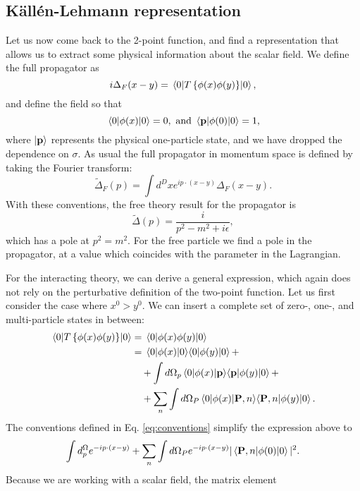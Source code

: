 \documentclass{article}
\numberwithin{equation}{section}
\begin{document}
\subsection{Källén-Lehmann representation}
Let us now come back to the 2-point function, and find a representation that allows us to extract some physical information about the scalar field. We define the full propagator as 
\begin{equation}
    i\Delta_F(x-y) = \ev{T\left\{\phi(x) \phi(y)\right\}}{0},
\end{equation}
and define the field so that 
\begin{equation} \label{eq:conventions}
    \ev{\phi(x)}{0} = 0, \text{ and } \mel{\vb{p}}{\phi(0)}{0} = 1,
\end{equation}
where $\ket{\vb{p}}$ represents the physical one-particle state, and we have dropped the dependence on $\sigma$. As usual the full propagator in momentum space is defined by taking the Fourier transform:
\begin{equation}
    \tilde{\Delta}_F(p) = \int d^Dx e^{ip \cdot (x-y)} \Delta_F(x-y).
\end{equation}
With these conventions, the free theory result for the propagator is 
\begin{equation}
    \tilde{\Delta}(p) = \frac{i}{p^2-m^2+i\epsilon},
\end{equation}
which has a pole at $p^2=m^2$. For the free particle we find a pole in the propagator, at a value which coincides with the parameter in the Lagrangian.

For the interacting theory, we can derive a general expression, which again does not rely on the perturbative definition of the two-point function. Let us first consider the case where $x^0 > y^0$. We can insert a complete set of zero-, one-, and multi-particle states in between:
\begin{equation}
\begin{aligned}
    \ev{T\left\{\phi(x) \phi(y)\right\}}{0} &= \ev{\phi(x) \phi(y)}{0} \\
    &= \ev{\phi(x)}{0} \!\! \ev{\phi(y)}{0} +\\
    &\quad + \int d\Omega_p \mel{0}{\phi(x)}{\vb{p}}\!\!\mel{\vb{p}}{\phi(y)}{0} +\\
    &\quad + \sum_n \int d\Omega_P \mel{0}{\phi(x)}{\vb{P}, n}\!\! \mel{\vb{P}, n}{\phi(y)}{0}.
\end{aligned}
\end{equation}
The conventions defined in Eq. \ref{eq:conventions} simplify the expression above to 
\begin{equation}
    \int d^\Omega_p e^{-ip \cdot (x-y)} + \sum_n \int d\Omega_P e^{-ip \cdot (x-y)} |\mel{\vb{P}, n}{\phi(0)}{0}|^2.
\end{equation}
Because we are working with a scalar field, the matrix element 
\end{document}
